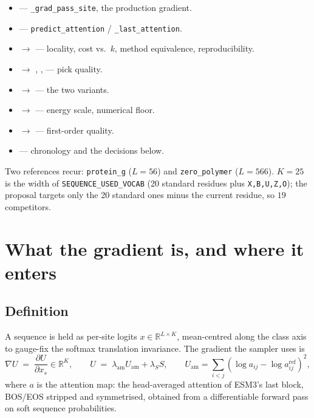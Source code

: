 \documentclass[11pt,a4paper]{article}
\newcommand{\gradU}{\nabla U}
\newcommand{\Uam}{U_{\mathrm{am}}}
\begin{document}
\begin{itemize}\itemsep2pt
  \item {} --- \texttt{\_grad\_pass\_site}, the
        production gradient.
  \item {} ---
        \texttt{predict\_attention} / \texttt{\_last\_attention}.
  \item {} $\rightarrow$
         --- locality, cost vs.\ $k$,
        method equivalence, reproducibility.
  \item {} $\rightarrow$
        ,
        ,
         --- pick quality.
  \item {} $\rightarrow$
         --- the two variants.
  \item {} $\rightarrow$
         --- energy scale, numerical floor.
  \item {} $\rightarrow$
         --- first-order quality.
  \item {} --- chronology and the decisions below.
\end{itemize}

Two references recur: \texttt{protein\_g} ($L=56$) and
\texttt{zero\_polymer} ($L=566$). $K=25$ is the width of
\texttt{SEQUENCE\_USED\_VOCAB} (20 standard residues plus
\texttt{X,B,U,Z,O}); the proposal targets only the 20 standard ones minus the
current residue, so $19$ competitors.

\section{What the gradient is, and where it enters}

\subsection{Definition}

A sequence is held as per-site logits $x \in \mathbb{R}^{L\times K}$,
mean-centred along the class axis to gauge-fix the softmax translation
invariance. The gradient the sampler uses is
\begin{equation}
  \gradU \;=\; \frac{\partial U}{\partial x_{s}} \in \mathbb{R}^{K},
  \qquad
  U \;=\; \lambda_{\mathrm{am}}\Uam + \lambda_{S} S,
  \qquad
  \Uam = \!\!\sum_{i<j}\!\left(\log a_{ij} - \log a^{\mathrm{ref}}_{ij}\right)^{2},
\end{equation}
where $a$ is the attention map: the head-averaged attention of ESM3's last
block, BOS/EOS stripped and symmetrised, obtained from a differentiable
forward pass on soft sequence probabilities.
\end{document}
